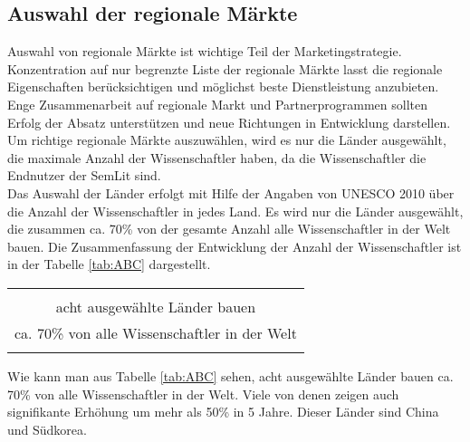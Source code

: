 \subsection{Auswahl der regionale Märkte}
Auswahl von regionale Märkte ist wichtige Teil der Marketingstrategie. Konzentration auf nur begrenzte Liste der regionale Märkte lasst die  regionale Eigenschaften berücksichtigen und möglichst beste Dienstleistung anzubieten. Enge Zusammenarbeit auf regionale Markt und Partnerprogrammen sollten Erfolg der Absatz unterstützen und neue Richtungen in Entwicklung darstellen.\\
Um richtige regionale Märkte auszuwählen, wird es nur die Länder ausgewählt, die maximale Anzahl der Wissenschaftler haben, da die Wissenschaftler die Endnutzer der SemLit sind. \\
Das Auswahl der Länder erfolgt mit Hilfe der Angaben von UNESCO 2010 über die Anzahl der Wissenschaftler in jedes Land. Es wird nur die Länder ausgewählt, die zusammen ca. 70\% von der gesamte Anzahl alle Wissenschaftler in der Welt bauen. Die Zusammenfassung der Entwicklung der Anzahl der Wissenschaftler ist in der Tabelle \ref{tab:ABC} dargestellt.\\
\begin{table}[h!]
  \centering
  \begin{large}
  \begin{tabular}{c}\hline
  \\
  {\color{orange}acht ausgewählte Länder bauen}\\
  {\color{orange}ca. 70\% von alle Wissenschaftler in der Welt}\\
  \\\hline
  \end{tabular}
  \end{large}
\end{table}
Wie kann man aus Tabelle \ref{tab:ABC} sehen, acht ausgewählte Länder bauen ca. 70\% von alle Wissenschaftler in der Welt. Viele von denen zeigen auch signifikante Erhöhung um mehr als 50\% in 5 Jahre. Dieser Länder sind China und Südkorea.


